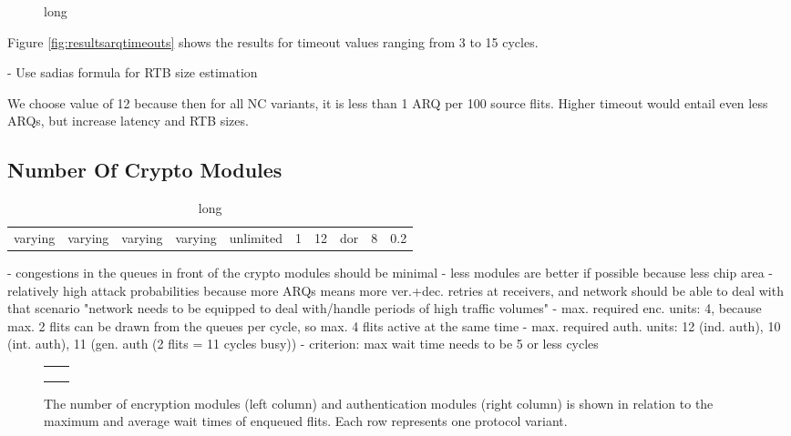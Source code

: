 \begin{figure}
    \centering
    
    \caption[Results for ARQ timeouts experiment]{long}
    \label{fig:resultsarqtimeouts}
\end{figure}

Figure \vref{fig:resultsarqtimeouts} shows the results for timeout values ranging from 3 to 15 cycles.

- Use sadias formula for RTB size estimation

We choose value of 12 because then for all NC variants, it is less than 1 ARQ per 100 source flits. Higher timeout would entail even less ARQs, but
increase latency and RTB sizes.

\subsection{Number Of Crypto Modules}
\begin{table}
    \centering
    \begin{tabulary}{\textwidth}{C|C|C|C|C|C|C|C|C|C}
        \pProtVar{} & \pNCMode{} & \pEncMods{} & \pAuthMods{} & \pRQSize{} & \pARQLimit{} & \pARQTimeout{} & \pRStrat{} & \pNumAttackers{} & \pAttackProb{} \\\hline
        varying     & varying    & varying     & varying      & unlimited  & 1            & 12             & \gls{dor}  & 8                & 0.2 \\
    \end{tabulary}
    \caption[Input parameters for number of crypto modules experiment]{long}
    \label{tab:setupnumcrypto}
\end{table}
- congestions in the queues in front of the crypto modules should be minimal
- less modules are better if possible because less chip area
- relatively high attack probabilities because more ARQs means more ver.+dec. retries at receivers, and network should be able to deal with that scenario
  "network needs to be equipped to deal with/handle periods of high traffic volumes"
- max. required enc. units: 4, because max. 2 flits can be drawn from the queues per cycle, so max. 4 flits active at the same time
- max. required auth. units: 12 (ind. auth), 10 (int. auth), 11 (gen. auth (2 flits = 11 cycles busy))
- criterion: max wait time needs to be 5 or less cycles

\begin{figure}
    \centering
    \begin{tabular}{ll}
         &  \\
         &  \\
         & 
    \end{tabular}
    \caption[Results for number of crypto modules experiment]{The number of encryption modules (left column) and authentication modules (right column)
    is shown in relation to the maximum and average wait times of enqueued flits. Each row represents one protocol variant.}
    \label{fig:resultscryptomodules}
\end{figure}

